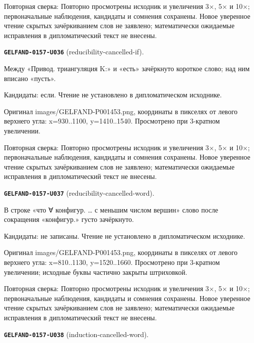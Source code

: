 Повторная сверка: Повторно просмотрены исходник и увеличения 3×, 5× и 10×; первоначальные наблюдения, кандидаты и сомнения сохранены. Новое уверенное чтение скрытых зачёркиванием слов не заявлено; математически ожидаемые исправления в дипломатический текст не внесены.\par\medskip
\par\noindent\leavevmode{}\label{GELFAND-0157-U036}\label{GELFAND-P001453:reducibility-cancelled-if}\textbf{\texttt{GELFAND-0157-U036}} (reducibility-cancelled-if).\nopagebreak[4]\par
Между «Привод. триангуляция K:» и «есть» зачёркнуто короткое слово; над ним вписано «пусть».\par
Кандидаты: если. Чтение не установлено в дипломатическом исходнике.\par
Оригинал images/GELFAND-P001453.png, координаты в пикселях от левого верхнего угла: x=930..1100, y=1410..1540. Просмотрено при 3-кратном увеличении.\par
Повторная сверка: Повторно просмотрены исходник и увеличения 3×, 5× и 10×; первоначальные наблюдения, кандидаты и сомнения сохранены. Новое уверенное чтение скрытых зачёркиванием слов не заявлено; математически ожидаемые исправления в дипломатический текст не внесены.\par\medskip
\par\noindent\leavevmode{}\label{GELFAND-0157-U037}\label{GELFAND-P001453:reducibility-cancelled-word}\textbf{\texttt{GELFAND-0157-U037}} (reducibility-cancelled-word).\nopagebreak[4]\par
В строке «что ∀ конфигур. … с меньшим числом вершин» слово после сокращения «конфигур.» густо зачёркнуто.\par
Кандидаты: не записаны. Чтение не установлено в дипломатическом исходнике.\par
Оригинал images/GELFAND-P001453.png, координаты в пикселях от левого верхнего угла: x=810..1130, y=1520..1660. Просмотрено при 3-кратном увеличении; исходные буквы частично закрыты штриховкой.\par
Повторная сверка: Повторно просмотрены исходник и увеличения 3×, 5× и 10×; первоначальные наблюдения, кандидаты и сомнения сохранены. Новое уверенное чтение скрытых зачёркиванием слов не заявлено; математически ожидаемые исправления в дипломатический текст не внесены.\par\medskip
\par\noindent\leavevmode{}\label{GELFAND-0157-U038}\label{GELFAND-P001453:induction-cancelled-word}\textbf{\texttt{GELFAND-0157-U038}} (induction-cancelled-word).\nopagebreak[4]\par
